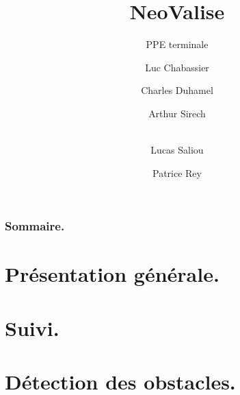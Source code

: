 \documentclass{beamer}
\title{NeoValise}
\subtitle{PPE terminale}
\author[Luc \and Charles \and Arthur \and Lucas \and Patrice]{Luc Chabassier \and Charles Duhamel \and Arthur Sirech \and\\ Lucas Saliou \and Patrice Rey}
\institute{Lycée Pierre de Fermat}
\begin{document}
\begin{frame}
	\maketitle
\end{frame}

\begin{frame}
	\frametitle{Sommaire.}
	\tableofcontents
\end{frame}

\section{Présentation générale.}


\section{Suivi.}


\section{Détection des obstacles.}

\end{document}
